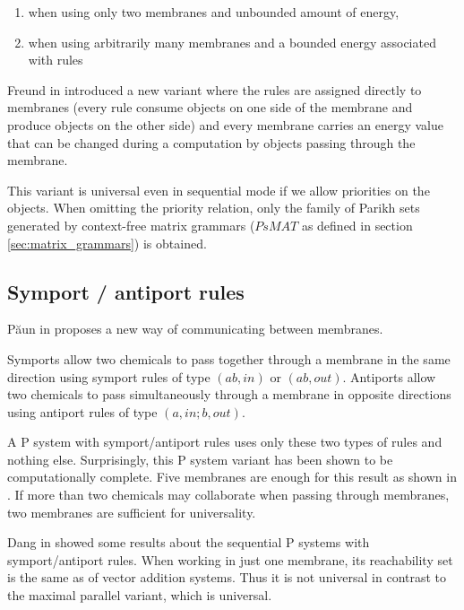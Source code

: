 \begin{enumerate}
	\item when using only two membranes and unbounded amount of energy,
	\item when using arbitrarily many membranes and a bounded energy associated with rules
\end{enumerate}

Freund in \cite{Freund:2004:SequentialEnergy} introduced a new variant where the rules are assigned directly to membranes (every rule consume objects on one side of the membrane and produce objects on the other side) and every membrane carries an energy value that can be changed during a computation by objects passing through the membrane.

This variant is universal even in sequential mode if we allow priorities on the objects. When omitting the priority relation, only the family of Parikh sets generated by context-free matrix grammars ($PsMAT$ as defined in section \ref{sec:matrix_grammars}) is obtained.


\subsection{Symport / antiport rules} %
\label{sub:symport_antiport_rules}

P\u{a}un in \cite{Paun:2002:SymportAntiport} proposes a new way of communicating between membranes.

Symports allow two chemicals to pass together through a membrane in the same direction using symport rules of type $(ab,in)$ or $(ab,out)$.
Antiports allow two chemicals to pass simultaneously through a membrane in opposite directions using antiport rules of type $(a,in;b,out)$.

A P system with symport/antiport rules uses only these two types of rules and nothing else. Surprisingly, this P system variant has been shown to be computationally complete. Five membranes are enough for this result as shown in \cite{Paun:2002:SymportAntiport}. If more than two chemicals may collaborate when passing through membranes, two membranes are sufficient for universality.

Dang in \cite{Dang04Sequential} showed some results about the sequential P systems with symport/antiport rules. When working in just one membrane, its reachability set is the same as of vector addition systems. Thus it is not universal in contrast to the maximal parallel variant, which is universal.

